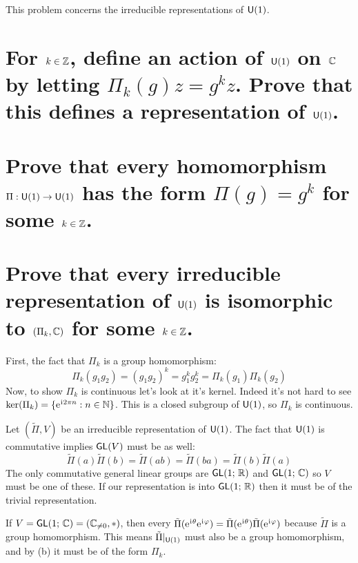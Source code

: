\documentclass[
	pages,
	boxes,
	color=WildStrawberry
]{homework}
\begin{document}
\begin{problem}
This problem concerns the irreducible representations of $\mathsf{U}(1)$.
\begin{parts}
	\part{For $k \in \mathbb{Z}$, define an action of $\mathsf{U}(1)$ on $\mathbb{C}$ by letting $\Pi_k(g) z = g^k z$. Prove that this defines a representation of $\mathsf{U}(1)$.}\label{part:7a}
	\part{Prove that every homomorphism $\Pi: \mathsf{U}(1) \to \mathsf{U}(1)$ has the form $\Pi(g) = g^k$ for some $k \in \mathbb{Z}$.}\label{part:7b}
	\part{Prove that every irreducible representation of $\mathsf{U}(1)$ is isomorphic to $(\Pi_k, \mathbb{C})$ for some $k \in \mathbb{Z}$.}\label{part:7c}
\end{parts}
\end{problem}

\begin{solution}
	\ref{part:7a}
	First, the fact that $\Pi_k$ is a group homomorphism:
	\begin{equation*}
		\Pi_k(g_1 g_2) = (g_1 g_2)^k = g_1^k g_2^k = \Pi_k(g_1)\Pi_k(g_2)
	\end{equation*}
	Now, to show $\Pi_k$ is continuous let's look at it's kernel. Indeed it's not hard to see $\ker(\Pi_k) = \{\mathrm{e}^{\mkern1mu\mathrm{i}\mkern1mu 2\pi n} : n\in \mathbb{N} \}$. This is a closed subgroup of $\mathsf{U}(1)$, so $\Pi_k$ is continuous.

	\ref{part:7b}
	\ref{part:7c}
	Let $(\tilde{\Pi}, V)$ be an irreducible representation of $\mathsf{U}(1)$. The fact that $\mathsf{U}(1)$ is commutative implies $\mathsf{GL}(V)$ must be as well:
	\begin{equation*}
		\tilde{\Pi}(a)\tilde{\Pi}(b) = \tilde{\Pi}(ab) = \tilde{\Pi}(ba) = \tilde{\Pi}(b)\tilde{\Pi}(a)
	\end{equation*}
	The only commutative general linear groups are $\mathsf{GL}(1;\, \mathbb{R})$ and $\mathsf{GL}(1;\, \mathbb{C})$ so $V$ must be one of these. If our representation is into $\mathsf{GL}(1;\, \mathbb{R})$ then it must be of the trivial representation.

	If $V = \mathsf{GL}(1;\, \mathbb{C}) = (\mathbb{C}_{\neq 0}, *)$, then every $\tilde{\Pi}(\mathrm{e}^{\mkern1mu\mathrm{i}\mkern1mu \theta}\mathrm{e}^{\mkern1mu\mathrm{i}\mkern1mu \varphi}) = \tilde{\Pi}(\mathrm{e}^{\mkern1mu\mathrm{i}\mkern1mu \theta})\tilde{\Pi}(\mathrm{e}^{\mkern1mu\mathrm{i}\mkern1mu \varphi})$ because $\tilde{\Pi}$ is a group homomorphism. This means $\tilde{\Pi}|_{\mathsf{U}(1)}$ must also be a group homomorphism, and by (b) it must be of the form $\Pi_k$.
\end{solution}
\end{document}

